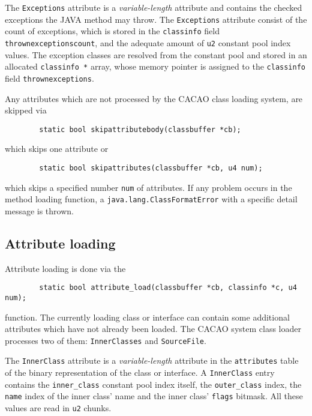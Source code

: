 The \texttt{Exceptions} attribute is a \textit{variable-length}
attribute and contains the checked exceptions the JAVA method may
throw. The \texttt{Exceptions} attribute consist of the count of
exceptions, which is stored in the \texttt{classinfo} field
\texttt{thrownexceptionscount}, and the adequate amount of \texttt{u2}
constant pool index values. The exception classes are resolved from
the constant pool and stored in an allocated \texttt{classinfo *}
array, whose memory pointer is assigned to the \texttt{classinfo}
field \texttt{thrownexceptions}.

Any attributes which are not processed by the CACAO class loading
system, are skipped via

\begin{verbatim}
        static bool skipattributebody(classbuffer *cb);
\end{verbatim}

which skips one attribute or

\begin{verbatim}
        static bool skipattributes(classbuffer *cb, u4 num);
\end{verbatim}

which skips a specified number \texttt{num} of attributes. If any
problem occurs in the method loading function, a
\texttt{java.lang.ClassFormatError} with a specific detail message is
thrown.


\subsection{Attribute loading}

Attribute loading is done via the

\begin{verbatim}
        static bool attribute_load(classbuffer *cb, classinfo *c, u4 num);
\end{verbatim}

function. The currently loading class or interface can contain some
additional attributes which have not already been loaded. The CACAO
system class loader processes two of them: \texttt{InnerClasses} and
\texttt{SourceFile}.

The \texttt{InnerClass} attribute is a \textit{variable-length}
attribute in the \texttt{attributes} table of the binary
representation of the class or interface. A \texttt{InnerClass} entry
contains the \texttt{inner\_class} constant pool index itself, the
\texttt{outer\_class} index, the \texttt{name} index of the inner
class' name and the inner class' \texttt{flags} bitmask. All these
values are read in \texttt{u2} chunks.

